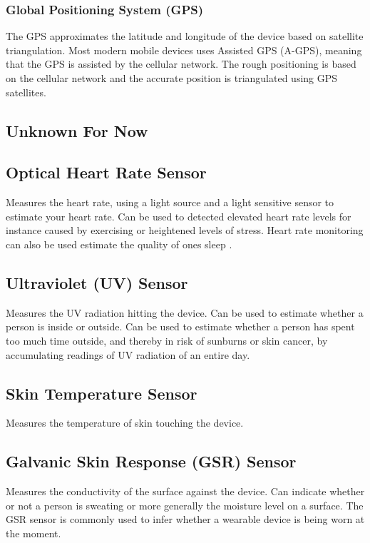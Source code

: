 \subsubsection{Global Positioning System (GPS)}
\label{sub:gps}
The GPS approximates the latitude and longitude of the device based on satellite triangulation. Most modern mobile devices uses Assisted GPS (A-GPS), meaning that the GPS is assisted by the cellular network. The rough positioning is based on the cellular network and the accurate position is triangulated using GPS satellites.


\subsection{Unknown For Now}
\label{sub:unknown_for_now}

\subsection{Optical Heart Rate Sensor}
\label{sub:optical_heart_rate_sensor}
Measures the heart rate, using a light source and a light sensitive sensor to estimate your heart rate. Can be used to detected elevated heart rate levels for instance caused by exercising or heightened levels of stress. Heart rate monitoring can also be used estimate the quality of ones sleep \parencite{guardian_fitness_tracker_rem_sleep}. 

\subsection{Ultraviolet (UV) Sensor}
\label{sub:uv_sensor}
Measures the UV radiation hitting the device. Can be used to estimate whether a person is inside or outside. Can be used to estimate whether a person has spent too much time outside, and thereby in risk of sunburns or skin cancer, by accumulating readings of UV radiation of an entire day.   

\subsection{Skin Temperature Sensor}
\label{sub:skin_temperature_sensor}
Measures the temperature of skin touching the device.  

\subsection{Galvanic Skin Response (GSR) Sensor}
\label{sub:galvanic_skin_respons_sensor}
Measures the conductivity of the surface against the device. Can indicate whether or not a person is sweating or more generally the moisture level on a surface. The GSR sensor is commonly used to infer whether a wearable device is being worn at the moment. 

